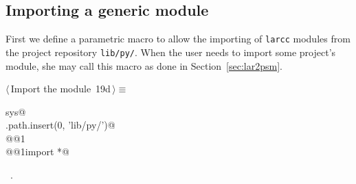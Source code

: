 \documentclass[11pt,oneside]{article}	%
\begin{document}
\subsection{Importing a generic module}
First we define a parametric macro to allow the importing of \texttt{larcc} modules from the project repository \texttt{lib/py/}. When the user needs to import some project's module, she may call this macro as done in Section~\ref{sec:lar2psm}.
\begin{flushleft} \small
\begin{minipage}{\linewidth} \label{scrap34}
\protect{}$\langle\,$Import the module\nobreak\ {\footnotesize 19d}$\,\rangle\equiv$
\vspace{-1ex}
\begin{list}{}{} \item
\mbox{}\verb@import sys@\\
\mbox{}\verb@sys.path.insert(0, 'lib/py/')@\\
\mbox{}\verb@import @@1\verb@@\\
\mbox{}\verb@from @@1\verb@ import *@\\
\mbox{}\verb@@{\NWsep}
\end{list}
\vspace{-1ex}
\footnotesize\addtolength{\baselineskip}{-1ex}
\begin{list}{}{\setlength{\itemsep}{-\parsep}\setlength{\itemindent}{-\leftmargin}}
\item \NWtxtMacroRefIn\ .
\end{list}
\end{minipage}\\[4ex]
\end{flushleft}
\end{document}
